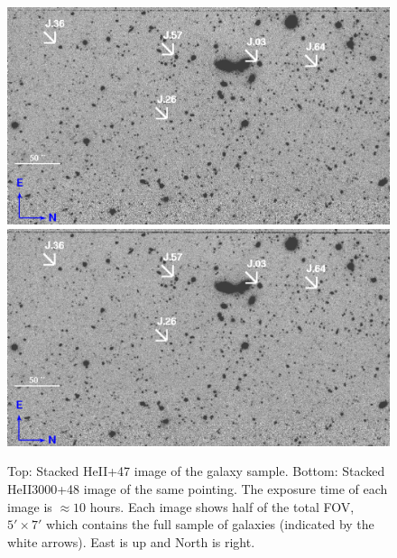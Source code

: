 \documentclass[twocolumn]{aastex61}
\begin{document}
\begin{figure}[ht!]
\centering
\includegraphics[scale=.61]{HEII_final.png}
\includegraphics[scale=.61]{HEII3000_final.png}
\caption{Top: Stacked HeII+47 image of the galaxy sample. Bottom: Stacked HeII3000+48 image of the same pointing. The exposure time of each image is $\approx 10$ hours. Each image shows half of the total FOV, $5' \times 7'$ which contains the full sample of galaxies (indicated by the white arrows). East is up and North is right.
\label{fig:stacked_image}}
\end{figure}
\end{document}
